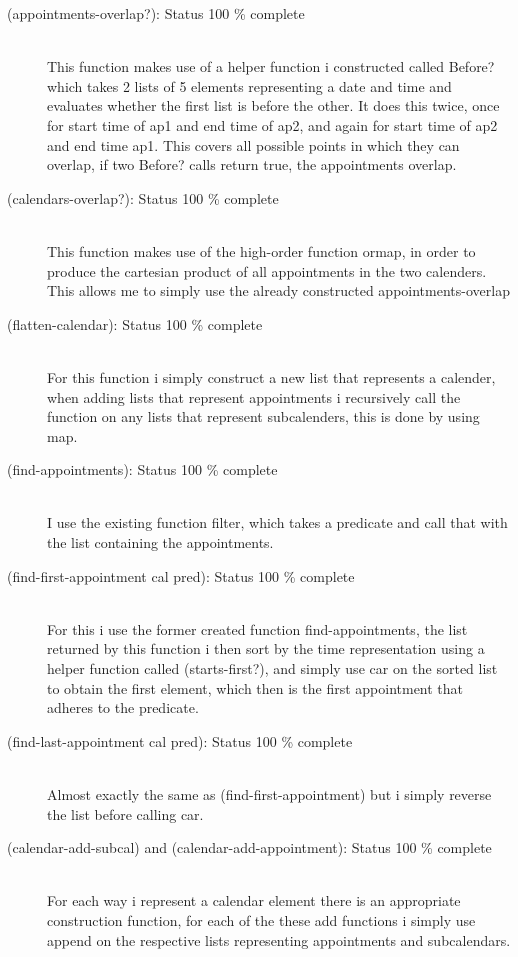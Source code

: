 \documentclass[11pt,a4paper,article,oneside]{memoir}
\begin{document}
\begin{description}
    \item [(appointments-overlap?): Status 100 \% complete] \hfill \\
    This function makes use of a helper function i constructed called Before? which takes 2 lists of 5 elements representing a date and time and evaluates whether the first list is before the other.
    It does this twice, once for start time of ap1 and end time of ap2, and again for start time of ap2 and end time ap1.
    This covers all possible points in which they can overlap, if two Before? calls return true, the appointments overlap.
    \item [(calendars-overlap?): Status 100 \% complete] \hfill \\
    This function makes use of the high-order function ormap, in order to produce the cartesian product of all appointments in the two calenders.
    This allows me to simply use the already constructed appointments-overlap
    \item [(flatten-calendar): Status 100 \% complete] \hfill \\
    For this function i simply construct a new list that represents a calender, when adding lists that represent appointments i recursively call the function on any lists that represent subcalenders, this is done by using map.
    \item [(find-appointments): Status 100 \% complete] \hfill \\
    I use the existing function filter, which takes a predicate and call that with the list containing the appointments.
    \item [(find-first-appointment cal pred): Status 100 \% complete] \hfill \\
    For this i use the former created function find-appointments, the list returned by this function i then sort by the time representation using a helper function called (starts-first?), and simply use car on the sorted list to obtain the first element, which then is the first appointment that adheres to the predicate.
    \item [(find-last-appointment cal pred): Status 100 \% complete] \hfill \\
    Almost exactly the same as (find-first-appointment) but i simply reverse the list before calling car.
    \item [(calendar-add-subcal) and (calendar-add-appointment): Status 100 \% complete] \hfill \\
    For each way i represent a calendar element there is an appropriate construction function, for each of the these add functions i simply use append on the respective lists representing appointments and subcalendars.

\end{description}
\end{document}
